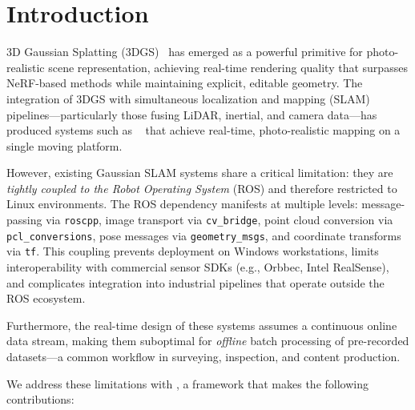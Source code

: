 \section{Introduction}
\label{sec:introduction}

3D Gaussian Splatting (3DGS)~\cite{kerbl2023_3dgs} has emerged as a powerful
primitive for photo-realistic scene representation, achieving real-time
rendering quality that surpasses NeRF-based methods while maintaining
explicit, editable geometry. The integration of 3DGS with simultaneous
localization and mapping (SLAM) pipelines---particularly those fusing
LiDAR, inertial, and camera data---has produced systems such as
\gaussianlic~\cite{lang2026_gaussianlic2} that achieve real-time,
photo-realistic mapping on a single moving platform.

However, existing Gaussian SLAM systems share a critical limitation: they are
\emph{tightly coupled to the Robot Operating System} (ROS) and therefore
restricted to Linux environments. The ROS dependency manifests at multiple
levels: message-passing via \texttt{roscpp}, image transport via
\texttt{cv\_bridge}, point cloud conversion via \texttt{pcl\_conversions},
pose messages via \texttt{geometry\_msgs}, and coordinate transforms via
\texttt{tf}. This coupling prevents deployment on Windows workstations,
limits interoperability with commercial sensor SDKs (e.g., Orbbec,
Intel RealSense), and complicates integration into industrial pipelines
that operate outside the ROS ecosystem.

Furthermore, the real-time design of these systems assumes a continuous
online data stream, making them suboptimal for \emph{offline} batch
processing of pre-recorded datasets---a common workflow in surveying,
inspection, and content production.

We address these limitations with \winlic, a framework that makes the
following contributions:

